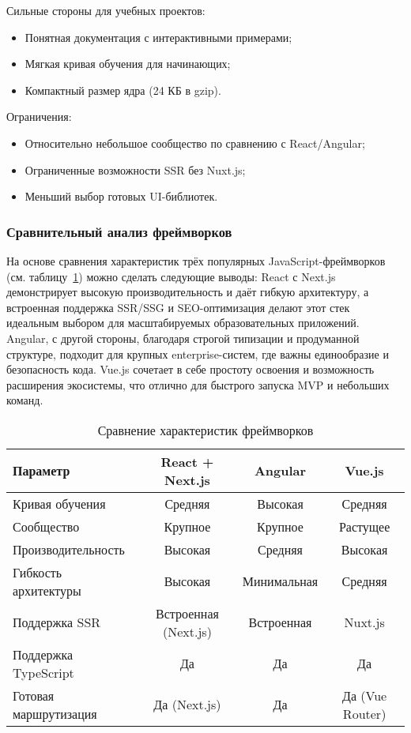 Сильные стороны для учебных проектов:
\begin{itemize}
  \item Понятная документация с интерактивными примерами;
  \item Мягкая кривая обучения для начинающих;
  \item Компактный размер ядра (24 КБ в gzip).
\end{itemize}

Ограничения:
\begin{itemize}
  \item Относительно небольшое сообщество по сравнению с React/Angular;
  \item Ограниченные возможности SSR без Nuxt.js;
  \item Меньший выбор готовых UI-библиотек.
\end{itemize}

\subsubsection{Сравнительный анализ фреймворков}

На основе сравнения характеристик трёх популярных JavaScript-фреймворков (см. таблицу~\ref{tab:framework-comparison}) можно сделать следующие выводы: React с Next.js демонстрирует высокую производительность и даёт гибкую архитектуру, а встроенная поддержка SSR/SSG и SEO-оптимизация делают этот стек идеальным выбором для масштабируемых образовательных приложений. Angular, с другой стороны, благодаря строгой типизации и продуманной структуре, подходит для крупных enterprise-систем, где важны единообразие и безопасность кода. Vue.js сочетает в себе простоту освоения и возможность расширения экосистемы, что отлично для быстрого запуска MVP и небольших команд.

\begin{table}[h]
  \small
  \centering
  \caption{Сравнение характеристик фреймворков}
  \label{tab:framework-comparison}
  \begin{tabular}{|l|c|c|c|}
    \hline
    \textbf{Параметр}         & React + Next.js       & Angular       & Vue.js   \\ \hline
    Кривая обучения           & Средняя               & Высокая       & Средняя  \\ \hline
    Сообщество                & Крупное               & Крупное       & Растущее \\ \hline
    Производительность        & Высокая               & Средняя       & Высокая  \\ \hline
    Гибкость архитектуры      & Высокая               & Минимальная   & Средняя  \\ \hline
    Поддержка SSR             & Встроенная (Next.js)  & Встроенная    & Nuxt.js  \\ \hline
    Поддержка TypeScript      & Да                    & Да            & Да       \\ \hline
    Готовая маршрутизация     & Да (Next.js)          & Да            & Да (Vue Router) \\ \hline
  \end{tabular}
\end{table}

